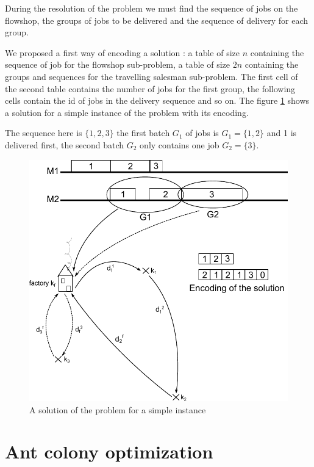 \documentclass[UTF8, twoside]{EPURapport}
\begin{document}
	During the resolution of the problem we must find the sequence of jobs on the flowshop, the groups of jobs to be delivered and the sequence of delivery for each group.

	We proposed a first way of encoding a solution : a table of size $n$ containing the sequence of job for the flowshop sub-problem, a table of size $2n$ containing the groups and sequences for the travelling salesman sub-problem. The first cell of the second table contains the number of jobs for the first group, the following cells contain the id of jobs in the delivery sequence and so on. The figure \ref{problem} shows a solution for a simple instance of the problem with its encoding. 
	
	The sequence here is $\{1,2,3\}$ the first batch $G_1$ of jobs is $G_1 = \{1,2\}$ and 1 is delivered first, the second batch $G_2$ only contains one job $G_2 = \{3\}$.
	
	
\begin{figure}
	\centering \includegraphics{images/problem.pdf}
	\caption {A solution of the problem for a simple instance}	
	\label {problem}
\end{figure}

\chapter{Ant colony optimization}
\end{document}
